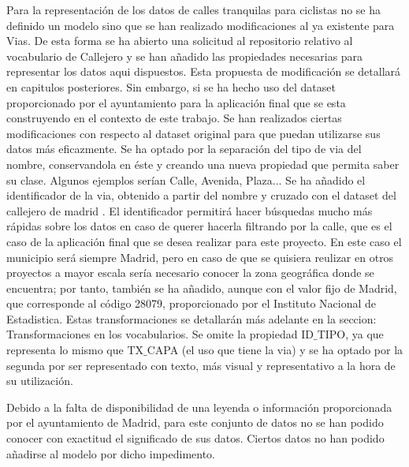 Para la representación de los datos de calles tranquilas para ciclistas no se ha definido un modelo sino que se han realizado modificaciones al ya existente para Vias. De esta forma se ha abierto una solicitud al repositorio relativo al vocabulario de Callejero \cite{ciudadesbiertas_callejero} y se han añadido las propiedades necesarias para representar los datos aqui dispuestos. Esta propuesta de modificación se detallará en capitulos posteriores.
\newline
Sin embargo, si se ha hecho uso del dataset proporcionado por el ayuntamiento para la aplicación final que se esta construyendo en el contexto de este trabajo. Se han realizados ciertas modificaciones con respecto al dataset original para que puedan utilizarse sus datos más eficazmente.\newline
Se ha optado por la separación del tipo de via del nombre, conservandola en éste y creando una nueva propiedad que permita saber su clase. Algunos ejemplos serían Calle, Avenida, Plaza...
Se ha añadido el identificador de la via, obtenido a partir del nombre y cruzado con el dataset del callejero de madrid \cite{datosmadrid_callejero}. El identificador permitirá hacer búsquedas mucho más rápidas sobre los datos en caso de querer hacerla filtrando por la calle, que es el caso de la aplicación final que se desea realizar para este proyecto.\newline
En este caso el municipio será siempre Madrid, pero en caso de que se quisiera reulizar en otros proyectos a mayor escala sería necesario conocer la zona geográfica donde se encuentra; por tanto, también se ha añadido, aunque con el valor fijo de Madrid, que corresponde al código 28079, proporcionado por el Instituto Nacional de Estadistica\cite{datosIgnMunicipios}.\newline
Estas transformaciones se detallarán más adelante en la seccion: Transformaciones en los vocabularios.
\newline
Se omite la propiedad ID$\_$TIPO, ya que representa lo mismo que TX$\_$CAPA (el uso que tiene la via) y se ha optado por la segunda por ser representado con texto, más visual y representativo a la hora de su utilización.
\newline


Debido a la falta de disponibilidad de una leyenda o información proporcionada por el ayuntamiento de Madrid, para este conjunto de datos no se han podido conocer con exactitud el significado de sus datos. Ciertos datos no han podido añadirse al modelo por dicho impedimento.


